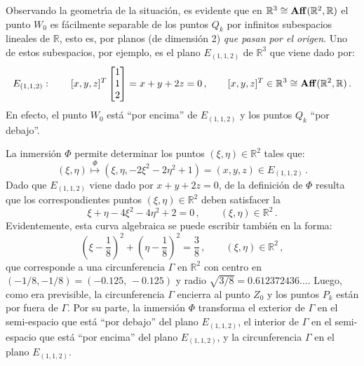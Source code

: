 Observando la geometr\'\i a de la situaci\'on, es evidente que
en $\mathbb{R}^3 \cong {\rm\bf Aff}(\mathbb{R}^2,\mathbb{R})$
el punto $W_0$ es f\'acilmente separable de los puntos $Q_k$
por infinitos subespacios lineales de $\mathbb{R}$, esto es,
por planos (de dimensi\'on 2) {\em que pasan por el origen\/}.
Uno de estos subespacios, por ejemplo, es el plano $E_{(1,1,2)}$
de $\mathbb{R}^3$ que viene dado por:
$$
E_{(1,1,2)}:\qquad
[x,y,z]^T \begin{bmatrix} 1 \\ 1 \\ 2 \end{bmatrix}
= x+y+2z = 0\,,\qquad 
[x,y,z]^T\in\mathbb{R}^3 \cong {\rm\bf Aff}(\mathbb{R}^2,\mathbb{R})\,.
$$
En efecto, el punto $W_0$ est\'a ``por encima'' de $E_{(1,1,2)}$
y los puntos $Q_k$ ``por debajo''.

\smallskip\noindent
La inmersi\'on $\Phi$ permite determinar los puntos
$(\xi,\eta)\in\mathbb{R}^2$ tales que:
$$
(\xi,\eta) \overset{\Phi}{\longmapsto} 
(\xi,\eta,-2\xi^2-2\eta^2+1) = (x,y,z)\in E_{(1,1,2)}\,.
$$
Dado que $E_{(1,1,2)}$ viene dado por $x+y+2z=0$, de la definici\'on de
$\Phi$ resulta que los correspondientes puntos $(\xi,\eta)\in\mathbb{R}^2$
deben satisfacer la 
$$
\xi + \eta - 4\xi^2 - 4\eta^2 + 2 = 0\,,\qquad
(\xi,\eta)\in\mathbb{R}^2\,.
$$
Evidentemente, esta curva algebraica se puede escribir tambi\'en en la
forma:
$$
\left( \xi-\frac18 \right)^2 + \left( \eta-\frac18 \right)^2
= \frac38\,,\qquad (\xi,\eta)\in\mathbb{R}^2\,,
$$
que corresponde a una circunferencia $\Gamma$ en $\mathbb{R}^2$
con centro en $(-1/8,-1/8)=(-0.125,\,-0.125)$ y radio 
$\sqrt{3/8}=0.612372436\dots$.
Luego, como era previsible, la circunferencia $\Gamma$ encierra
al punto $Z_0$ y los puntos $P_k$ est\'an por fuera de $\Gamma$.
Por su parte, la inmersi\'on $\Phi$ transforma
el exterior de $\Gamma$ en el semi-espacio que est\'a
``por debajo'' del plano $E_{(1,1,2)}$, 
el interior de $\Gamma$ en el semi-espacio que est\'a
``por encima'' del plano $E_{(1,1,2)}$, y
la circunferencia $\Gamma$ en el plano $E_{(1,1,2)}$.



